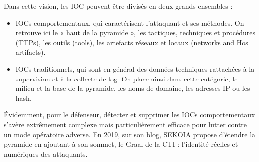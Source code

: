 \documentclass[a4paper]{article}
\begin{document}
Dans cette vision, les IOC peuvent être divisés en deux grands ensembles :
\begin{itemize}
\item IOCs comportementaux, qui caractérisent l’attaquant et ses méthodes. On retrouve ici le « haut de la pyramide », les tactiques, techniques et procédures (TTPs), les outils (tools), les artefacts réseaux et locaux (networks and Hos artifacts).
\item IOCs traditionnels, qui sont en général des données techniques rattachées à la supervision et à la collecte de log. On place ainsi dans cette catégorie, le milieu et la base de la pyramide, les noms de domaine, les adresses IP ou les hash.
\end{itemize}

Évidemment, pour le défenseur, détecter et supprimer les IOCs comportementaux s’avère extrêmement complexe mais particulièrement efficace pour lutter contre un mode opératoire adverse. En 2019, sur son blog, SEKOIA propose d’étendre la pyramide en ajoutant à son sommet, le Graal de la CTI : l’identité réelles et numériques des attaquants.
\end{document}
